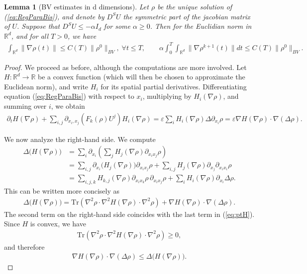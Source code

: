 \documentclass[11pt,twoside]{article}
\numberwithin{equation}{section}
\newcommand{\R}{\mathbb{R}}
\newcommand {\eps}  {\varepsilon}
\newcommand {\p}   {\partial}
\newtheorem{lemma}[theorem]{Lemma}
\begin{document}
\begin{lemma}[BV estimates in d dimensions]
\label{thm:LemmaMultiD}
Let $\rho$ be the unique solution of (\ref{eq:RegParaBis}), and denote by $D^SU$ the symmetric part of the jacobian matrix of $U$. Suppose that $D^SU \leq- \alpha I_d$ for some $\alpha\ge0$. Then for the Euclidian norm in $\R^d$, and for all $T>0$,  we have
\begin{align} \label{eq:BV} 
\int_{\R^d}\| \nabla \rho(t)\| \leq C(T)\|\rho^0\|_{BV}, \; \forall t \leq T, \qquad \alpha \int_0^T \int_{\R^d}\| \nabla \rho^{k+1} (t)\| dt\leq C(T)\|\rho^0\|_{BV}.
\end{align}
\end{lemma}

\begin{proof}
We proceed as before, although the computations are more involved. Let $H : \R^d \rightarrow \R$ be a convex function (which will then be chosen to approximate the Euclidean norm), and write $H_i$ for its spatial partial derivatives. Differentiating equation (\ref{eq:RegParaBis}) with respect to $x_i$, multiplying by $H_i(\nabla \rho)$, and summing over $i$, we obtain
\begin{align}
\label{eq:ptH}
\p_t H(\nabla \rho) + \sum_{i,j} \p_{x_i,x_j}\left(F_k(\rho)U^j\right) H_i(\nabla \rho)
= \eps \sum_i H_i(\nabla \rho) \Delta \p_{x_i}\rho = \eps \nabla H(\nabla \rho) \cdot \nabla (\Delta \rho).
\end{align}

We now analyze the right-hand side. We compute
\begin{align*}
\Delta \big( H(\nabla \rho) \big)
&= \sum_i \p_{x_i} \left( \sum_j H_j(\nabla \rho) \p_{x_i x_j} \rho \right) \\
&= \sum_{i,j} \p_{x_i}\big(H_j(\nabla \rho)\big) \p_{x_i x_j} \rho
  + \sum_{i,j} H_j(\nabla \rho) \p_{x_j} \p_{x_i x_i} \rho \\
&= \sum_{i,j,k} H_{k,j}(\nabla \rho) \p_{x_i x_k}\rho \, \p_{x_i x_j}\rho
  + \sum_i H_i(\nabla \rho)\p_{x_i}\Delta \rho.
\end{align*}
This can be written more concisely as
\begin{align*}
\Delta \big( H(\nabla \rho) \big)
= \mathrm{Tr}\!\left(\nabla^2 \rho \cdot \nabla^2 H(\nabla \rho) \cdot \nabla^2 \rho\right)
+ \nabla H(\nabla \rho) \cdot \nabla (\Delta \rho).
\end{align*}
The second term on the right-hand side coincides with the last term in (\ref{eq:ptH}). Since $H$ is convex, we have
\begin{align*}
\mathrm{Tr}\!\left(\nabla^2 \rho \cdot \nabla^2 H(\nabla \rho) \cdot \nabla^2 \rho\right) \ge 0,
\end{align*}
and therefore
\begin{align*}
\nabla H(\nabla \rho) \cdot \nabla (\Delta \rho)
\le \Delta \big( H(\nabla \rho) \big).
\end{align*}


\end{proof}
\end{document}
